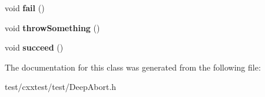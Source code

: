 \begin{DoxyCompactItemize}
\item 
\hypertarget{classDeepAbort_a380c59fd7c24b2d439f658e6a29a9885}{void {\bfseries fail} ()}\label{classDeepAbort_a380c59fd7c24b2d439f658e6a29a9885}

\item 
\hypertarget{classDeepAbort_ae556d1c9b910303033f5178bf42ec663}{void {\bfseries throw\-Something} ()}\label{classDeepAbort_ae556d1c9b910303033f5178bf42ec663}

\item 
\hypertarget{classDeepAbort_ab69206477c9b9ae86bb494bcb9f6e974}{void {\bfseries succeed} ()}\label{classDeepAbort_ab69206477c9b9ae86bb494bcb9f6e974}

\end{DoxyCompactItemize}


The documentation for this class was generated from the following file\-:\begin{DoxyCompactItemize}
\item 
test/cxxtest/test/Deep\-Abort.\-h\end{DoxyCompactItemize}
